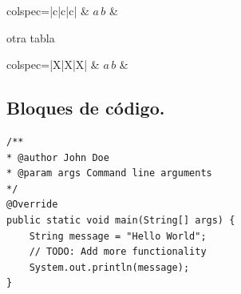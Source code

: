     \begin{tblr}{colspec={|c|c|c|}}
        {\ttfamily\small\color{OliveGreen}}& $a\,b$ & \\
    \end{tblr}
    
    otra tabla 
    
    \begin{tblr}{colspec={|X|X|X|}}
        {\ttfamily\small\color{OliveGreen}}& $a\,b$ & \\
    \end{tblr}
    
    \subsection{Bloques de código.}
    
    \begin{lstlisting}[style=IntelliJLight]
/**
* @author John Doe
* @param args Command line arguments
*/
@Override
public static void main(String[] args) {
    String message = "Hello World";
    // TODO: Add more functionality
    System.out.println(message);
}
    \end{lstlisting}
    
    

